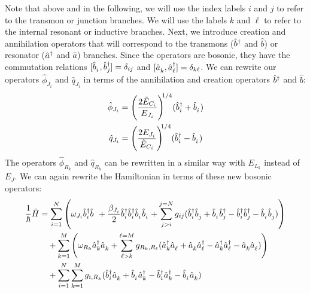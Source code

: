 Note that above and in the following, we will use the index labels $i$ and $j$ to refer to the transmon or junction branches. We will use the labels $k$ and $\ell$ to refer to the internal resonant or inductive branches. Next, we introduce creation and annihilation operators that will correspond to the transmons ($\hat{b}^{\dagger}$ and $\hat{b}$) or resonator ($\hat{a}^{\dagger}$ and $\hat{a}$) branches. Since the operators are bosonic, they have the commutation relations $[\opb_i, \opbd_j]=\delta_{ij}$ and $[\opa_k, \opad_\ell]=\delta_{k\ell}$. We can rewrite our operators $\hat{\phi}_{J_i}$ and $\hat{q}_{J_i}$ in terms of the annihilation and creation operators $\hat{b}^{\dagger}$ and $\hat{b}$:
\begin{align}
    \hat{\phi}_{J_i} &= \Bigg( \frac{2\tilde{E}_{C_i}}{E_{J_i}} \Bigg)^{\!\!1/4} (\opbd_{i} + \opb_{i}) \\
    \hat{q}_{J_i} &= \Bigg( \frac{2E_{J_i}}{\tilde{E}_{C_i}} \Bigg)^{\!\!1/4} (\opbd_{i} - \opb_{i})
\end{align}
The operators $\hat{\phi}_{R_k}$ and $\hat{q}_{R_k}$ can be rewritten in a similar way with $E_{L_k}$ instead of $E_J$. We can again rewrite the Hamiltonian in terms of these new bosonic operators:
\begin{align}
\begin{split}\label{eq:transmon_resonator_ham}
    \frac{1}{\hbar}\hat{H} &= \sum_{i=1}^N \left(  \omega_{J_i}\opbd_i\opb + \frac{\beta_{J_i}}{2}\opbd_i\opbd_i\opb_i\opb_i  + \sum_{j > i}^{j=N} g_{ij} (\opbd_i\opb_j + \opb_i\opbd_j - \opbd_i\opbd_j - \opb_i\opb_j) \right) \\
    &\quad + \sum_{k=1}^M \left( \omega_{R_k}\opad_k\opa_k + \sum_{\ell > k}^{\ell=M} g_{R_k,R_\ell} (\opad_k\opa_\ell + \opa_k\opad_\ell - \opad_k\opad_\ell - \opa_k\opa_\ell) \right) \\ 
    &\quad + \sum_{i=1}^N \sum_{k=1}^M g_{i,R_k}(\opbd_i\opa_k + \opb_i\opad_k - \opbd_i\opad_k - \opb_i\opa_k)
\end{split}
\end{align}

